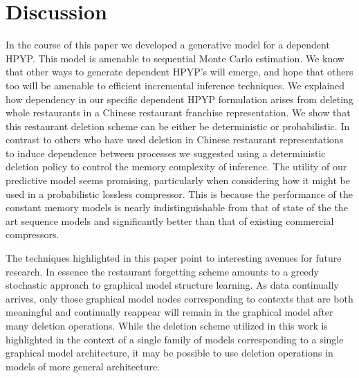 \section{Discussion}
\label{discussion}

In the course of this paper we developed a generative model for a dependent HPYP. This model is amenable to sequential Monte Carlo estimation.  We know that other ways to generate dependent HPYP's will emerge, and hope that others too will be amenable to efficient incremental inference techniques.  We explained how dependency in our specific dependent HPYP formulation arises from deleting whole restaurants in a Chinese restaurant franchise representation.  We show that this restaurant deletion scheme can be either be deterministic or probabilistic.  In contrast to others who have used deletion in Chinese restaurant representations to induce dependence between processes we suggested using a deterministic deletion policy to control the memory complexity of inference.  The utility of our predictive model seems promising, particularly when considering how it might be used in a probabilistic lossless compressor.  This is because the performance of the constant memory models is nearly indistinguishable from that of state of the the art sequence models and significantly better than that of existing commercial compressors.

The techniques highlighted in this paper point to interesting avenues for future research.  In essence the restaurant forgetting scheme amounts to a greedy stochastic approach to graphical model structure learning.  As data continually arrives, only those graphical model nodes corresponding to contexts that are both meaningful and continually reappear will remain in the graphical model after many deletion operations.   While the deletion scheme utilized in this work is highlighted in the context of a single family of models corresponding to a single graphical model architecture, it may be possible to use deletion operations in models of more general architecture.
